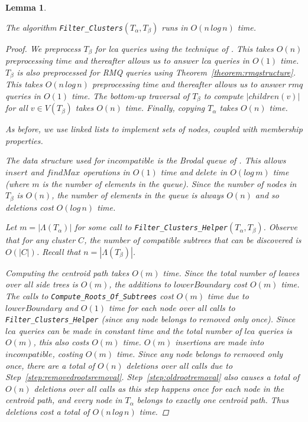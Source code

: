 \documentclass{article}
\newcommand{\leafset}{\Lambda}
\newtheorem{filterclustersruntime}[incompatibility]{Lemma}
\begin{document}
    \bigskip
    \begin{filterclustersruntime}
        \label{lem:filterclustersruntime}

        The algorithm \texttt{Filter\_Clusters}$(T_\alpha, T_\beta)$ runs in $O(n\,log\,n)$ time.

        \begin{proof}
            We preprocess $T_\beta$ for \textit{lca} queries using the technique of \cite{bender2000lca}. This takes $O(n)$ preprocessing time and thereafter allows us to answer \textit{lca} queries in $O(1)$ time. $T_\beta$ is also preprocessed for RMQ queries using Theorem~\ref{theorem:rmqstructure}. This takes $O(n\,log\,n)$ preprocessing time and thereafter allows us to answer $rmq$ queries in $O(1)$ time. The bottom-up traversal of $T_\beta$ to compute $|children(v)|$ for all $v \in V(T_\beta)$ takes $O(n)$ time. Finally, copying $T_\alpha$ takes $O(n)$ time.

            As before, we use linked lists to implement sets of nodes, coupled with membership properties.

            The data structure used for $incompatible$ is the Brodal queue of \cite{brodal1995fast}. This allows $insert$ and $findMax$ operations in $O(1)$ time and $delete$ in $O(log\,m)$ time (where $m$ is the number of elements in the queue). Since the number of nodes in $T_\beta$ is $O(n)$, the number of elements in the queue is always $O(n)$ and so deletions cost $O(log\,n)$ time.

            Let $m = |\leafset(T_\alpha)|$ for some call to \texttt{Filter\_Clusters\_Helper}$(T_\alpha, T_\beta)$. Observe that for any cluster $C$, the number of compatible subtrees that can be discovered is $O(|C|)$. Recall that $n = |\leafset(T_\beta)|$.

            Computing the centroid path takes $O(m)$ time. Since the total number of leaves over all side trees is $O(m)$, the additions to $lowerBoundary$ cost $O(m)$ time. The calls to \texttt{Compute\_Roots\_Of\_Subtrees} cost $O(m)$ time due to $lowerBoundary$ and $O(1)$ time for each node over all calls to \texttt{Filter\_Clusters\_Helper} (since any node belongs to $removed$ only once). Since $lca$ queries can be made in constant time and the total number of $lca$ queries is $O(m)$, this also costs $O(m)$ time. $O(m)$ insertions are made into $incompatible$, costing $O(m)$ time. Since any node belongs to $removed$ only once, there are a total of $O(n)$ deletions over all calls due to Step~\ref{step:removedrootsremoval}. Step~\ref{step:oldrootremoval} also causes a total of $O(n)$ deletions over all calls as this step happens once for each node in the centroid path, and every node in $T_\alpha$ belongs to exactly one centroid path. Thus deletions cost a total of $O(n\,log\,n)$ time.


\end{proof}
\end{filterclustersruntime}
\end{document}
